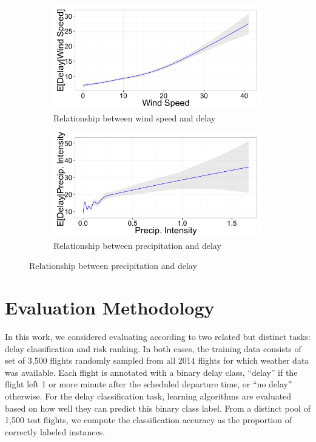 \documentclass[twocolumn]{article}
\begin{document}
\begin{figure}
    \centering
\begin{subfigure}{0.45\textwidth}
    \centering
    \includegraphics[width=\linewidth]{figures/windSpeed.png}
    \caption{Relationship between wind speed and delay}
    \label{fig:wind-speed-delay-relationship}
\end{subfigure}
\begin{subfigure}{0.45\textwidth}
    \centering
    \includegraphics[width=\linewidth]{figures/precipIntensity.png}
    \caption{Relationship between precipitation and delay}
    \label{fig:precip-delay-relationship}
\end{subfigure}
\end{figure}

\begin{figure}
\end{figure}


\section{Evaluation Methodology}
\label{sec:evaluation-methodology}

In this work, we considered evaluating according to two related but distinct tasks: delay classification and risk ranking. In both cases, the training data consists of set of 3,500 flights randomly sampled from all 2014 flights for which weather data was available. Each flight is annotated with a binary delay class, ``delay'' if the flight left 1 or more minute after the scheduled departure time, or ``no delay'' otherwise. For the delay classification task, learning algorithms are evaluated based on how well they can predict this binary class label. From a distinct pool of 1,500 test flights, we compute the classification accuracy as the proportion of correctly labeled instances.
\end{document}
